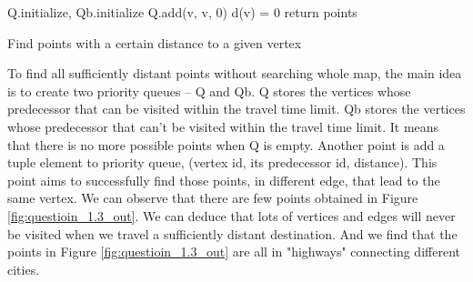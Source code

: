 \documentclass[titlepage,11pt,a4paper]{article}
\begin{document}
\begin{algorithm}[H]

 Q.initialize, Qb.initialize\;
 Q.add(v, v, 0)\;
 d(v) = 0\;
 return points\;
 \caption{Find points with a certain distance to a given vertex}
\end{algorithm}
To find all sufficiently distant points without searching whole map, the main idea is to create two priority queues -- Q and Qb. Q stores the vertices whose predecessor that can be visited within the travel time limit. Qb stores the vertices whose predecessor that can't be visited within the travel time limit. It means that there is no more possible points when Q is empty. Another point is add a tuple element to priority queue, (vertex id, its predecessor id, distance). This point aims to successfully find those points, in different edge, that lead to the same vertex.
We can observe that there are few points obtained in Figure \ref{fig:questioin_1.3_out}. We can deduce that lots of vertices and edges will never be visited when we travel a sufficiently distant destination. And we find that the points in Figure \ref{fig:questioin_1.3_out} are all in "highways" connecting different cities.
\end{document}
